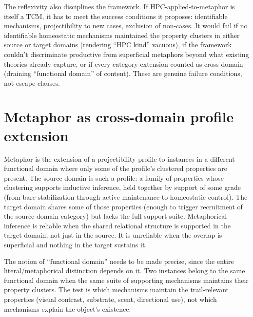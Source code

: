 \documentclass[12pt]{article}
\begin{document}
The reflexivity also disciplines the framework. If HPC-applied-to-metaphor is itself a TCM, it has to meet the success conditions it proposes: identifiable mechanisms, projectibility to new cases, exclusion of non-cases. It would fail if no identifiable homeostatic mechanisms maintained the property clusters in either source or target domains (rendering \enquote{HPC kind} vacuous), if the framework couldn't discriminate productive from superficial metaphors beyond what existing theories already capture, or if every category extension counted as cross-domain (draining \enquote{functional domain} of content). These are genuine failure conditions, not escape clauses.

\section{Metaphor as cross-domain profile extension}
\label{sec:reframing}

Metaphor is the extension of a projectibility profile to instances in a different functional domain where only some of the profile's clustered properties are present. The source domain is such a profile: a family of properties whose clustering supports inductive inference, held together by support of some grade (from bare stabilization through active maintenance to homeostatic control). The target domain shares some of those properties (enough to trigger recruitment of the source-domain category) but lacks the full support suite. Metaphorical inference is reliable when the shared relational structure is supported in the target domain, not just in the source. It is unreliable when the overlap is superficial and nothing in the target sustains it.

The notion of \enquote{functional domain} needs to be made precise, since the entire literal/metaphorical distinction depends on it. Two instances belong to the same functional domain when the same suite of supporting mechanisms maintains their property clusters. The test is which mechanisms maintain the trail-relevant properties (visual contrast, substrate, scent, directional use), not which mechanisms explain the object's existence.
\end{document}
